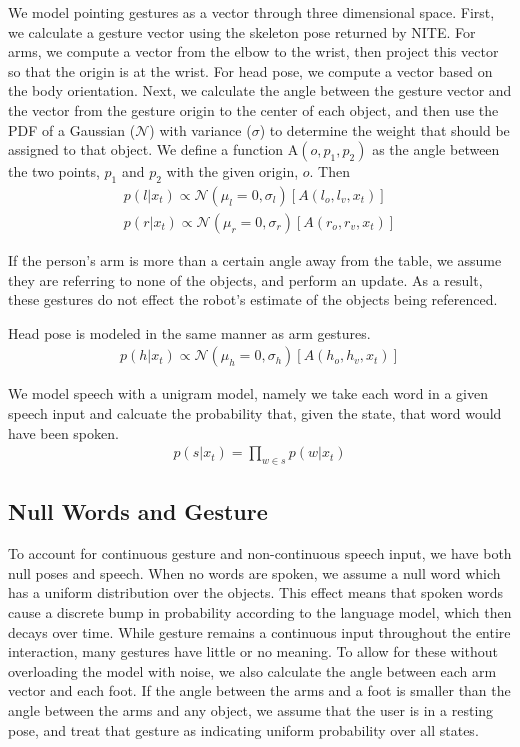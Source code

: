 \documentclass[letterpaper, 10 pt, conference]{ieeeconf}
\begin{document}
  We model pointing gestures as a vector
through three dimensional space.  First, we calculate a gesture vector
using the skeleton pose returned by NITE.  For arms, we compute a
vector from the elbow to the wrist, then project this vector so that the origin is at the wrist.  For head pose, we compute a
vector based on the body orientation. Next, we calculate the angle between the gesture
vector and the vector from the gesture origin to the center of each object, and then use the PDF of a Gaussian ($\mathcal{N}$) with
variance ($\sigma$) to determine the weight that should be assigned to
that object. We define a function $\mbox{A}(o, p_1, p_2)$ as the angle
between the two points, $p_1$ and $p_2$ with the given origin, $o$.
Then
\begin{align}
p(l | x_t) \propto \mathcal{N}(\mu_l=0, \sigma_l)[A(l_o, l_v, x_t)]\\
p(r | x_t) \propto \mathcal{N}(\mu_r=0, \sigma_r)[A(r_o, r_v, x_t)]
\end{align}

If the person's arm is more than a certain angle away from the table,
we assume they are referring to none of the objects, and perform an
update.  As a result, these gestures do not effect the robot's
estimate of the objects being referenced.

Head pose is modeled in the same manner as arm gestures.
\begin{align}
p(h | x_t) \propto \mathcal{N}(\mu_h=0, \sigma_h)[A(h_o, h_v, x_t)]
\end{align}


  We model speech with a unigram model, namely we
take each word in a given speech input and calcuate the probability that, given the state, that word would have been spoken.
\begin{align}
p(s |x_t) = \displaystyle \prod_{w \in s} p(w | x_t)
\end{align}


\subsection{Null Words and Gesture}

To account for continuous gesture and non-continuous speech input, we
have both null poses and speech.  When no words are spoken, we assume
a null word which has a uniform distribution over the objects.  This
effect means that spoken words cause a discrete bump in probability
according to the language model, which then decays over time. While
gesture remains a continuous input throughout the entire interaction,
many gestures have little or no meaning. To allow for these without
overloading the model with noise, we also calculate the angle between
each arm vector and each foot. If the angle between the arms and a
foot is smaller than the angle between the arms and any object, we
assume that the user is in a resting pose, and treat that gesture as
indicating uniform probability over all states.
\end{document}
